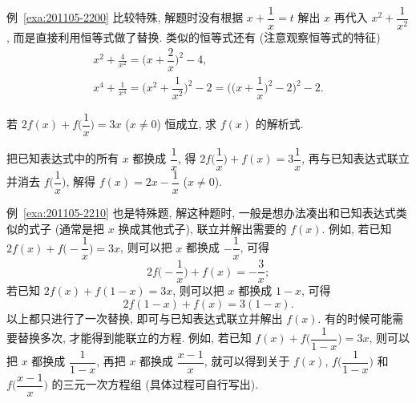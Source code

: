 例~\ref{exa:201105-2200} 比较特殊, 解题时没有根据 $x+\dfrac1x=t$ 解出 $x$ 再代入 $x^2+\dfrac1{x^2}$, 而是直接利用恒等式做了替换. 类似的恒等式还有 (注意观察恒等式的特征)
\begin{gather*}
    x^2+\frac4{x^2}= \biggl(x+\dfrac2x\biggr)^2-4,\\
    x^4+\frac1{x^4}= \biggl(x^2+\dfrac1{x^2}\biggr)^2-2
        = \biggl(\biggl(x+\dfrac1x\biggr)^2-2\biggr)^2-2.
\end{gather*}

\begin{example}\label{exa:201105-2210}
    若 $2f(x)+f\biggl(\dfrac1x\biggr)=3x$ ($x\neq 0$) 恒成立, 求 $f(x)$ 的解析式.
\end{example}
\begin{solution}
    把已知表达式中的所有 $x$ 都换成 $\dfrac1x$, 得 $2f\biggl(\dfrac1x\biggr)+f(x)=3\dfrac1x$, 再与已知表达式联立并消去 $f\biggl(\dfrac1x\biggr)$, 解得 $f(x)= 2x-\dfrac1x$ ($x\neq0$).
\end{solution}

例~\ref{exa:201105-2210} 也是特殊题, 解这种题时, 一般是想办法凑出和已知表达式类似的式子 (通常是把 $x$ 换成其他式子), 联立并解出需要的 $f(x)$. 例如, 若已知 $2f(x)+f\biggl(-\dfrac1x\biggr)=3x$, 则可以把 $x$ 都换成 $-\dfrac1x$, 可得 
\[2f\biggl(-\dfrac1x\biggr)+f(x)= -\dfrac3x;\]
若已知 $2f(x)+f(1-x)=3x$, 则可以把 $x$ 都换成 $1-x$, 可得
\[2f(1-x)+f(x)=3(1-x).\]
以上都只进行了一次替换, 即可与已知表达式联立并解出 $f(x)$. 有的时候可能需要替换多次, 才能得到能联立的方程. 例如, 若已知 $f(x)+f\biggl(\dfrac1{1-x}\biggr)=3x$, 则可以把 $x$ 都换成 $\dfrac1{1-x}$, 再把 $x$ 都换成 $\dfrac{x-1}{x}$, 就可以得到关于 $f(x)$, $f\biggl(\dfrac1{1-x}\biggr)$ 和 $f\biggl(\dfrac{x-1}{x}\biggr)$ 的三元一次方程组 (具体过程可自行写出).